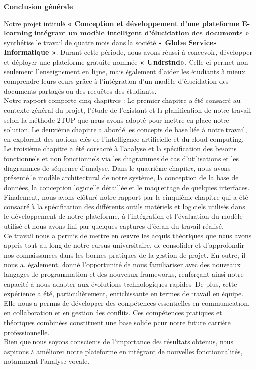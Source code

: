 \thispagestyle{plain} 
\begin{center}
    \textbf{\Huge Conclusion générale}
\end{center}
  
Notre projet intitulé \textbf{« Conception et développement d’une plateforme E-learning intégrant un modèle intelligent d’élucidation des documents »} synthétise le travail de quatre mois dans la société \textbf{« Globe Services Informatique »}. Durant cette période, nous avons réussi à concevoir, développer et déployer  une plateforme  gratuite nommée \textbf{« Undrstnd»}. Celle-ci permet non seulement l’enseignement en ligne, mais également d’aider les étudiants à mieux comprendre leurs cours grâce à l'intégration d’un modèle d’élucidation des documents partagés ou des requêtes des étudiants. \\

Notre rapport comporte cinq chapitres : Le premier chapitre a été consacré au contexte général du projet, l’étude de l’existant et la planification de notre travail selon la méthode 2TUP que nous avons adopté pour mettre en place notre solution. Le deuxième chapitre a abordé les concepts de base liée à notre travail, en explorant des notions clés de l’intelligence artificielle et du cloud computing. Le troisième chapitre a été consacré à l’analyse et la spécification des besoins fonctionnels et non fonctionnels via les diagrammes de cas d’utilisations et les diagrammes de séquence d’analyse. Dans le quatrième chapitre, nous avons présenté le modèle architectural de notre système, la conception de la base de données, la conception logicielle détaillée et le maquettage de quelques interfaces. Finalement, nous avons clôturé notre rapport par le cinquième chapitre qui a été consacré à la spécification des différents outils matériels et logiciels utilisés dans le développement de notre plateforme, à l’intégration et l’évaluation du modèle utilisé et nous avons fini par quelques captures d’écran du travail réalisé.\\

Ce travail nous a permis de mettre en œuvre les acquis théoriques que nous avons appris tout au long de notre cursus universitaire, de consolider et d’approfondir nos connaissances dans les bonnes pratiques de la gestion de projet. En outre, il nous a, également, donné l'opportunité de nous familiariser avec des nouveaux langages de programmation et des nouveaux frameworks, renforçant ainsi notre capacité à nous adapter aux évolutions technologiques rapides. De plus, cette expérience a été, particulièrement, enrichissante en termes de travail en équipe. Elle nous a permis de développer des compétences essentielles en communication, en collaboration et en gestion des conflits. Ces compétences pratiques et théoriques combinées constituent une base solide pour notre future carrière professionnelle.\\

\noindent Bien que nous soyons conscients de l'importance des résultats obtenus, nous aspirons à améliorer notre plateforme en intégrant de nouvelles fonctionnalités, notamment l'analyse vocale. 
